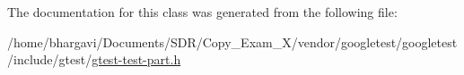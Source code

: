 The documentation for this class was generated from the following file\+:\begin{DoxyCompactItemize}
\item 
/home/bhargavi/\+Documents/\+S\+D\+R/\+Copy\+\_\+\+Exam\+\_\+X/vendor/googletest/googletest/include/gtest/\hyperlink{gtest-test-part_8h}{gtest-\/test-\/part.\+h}\end{DoxyCompactItemize}
